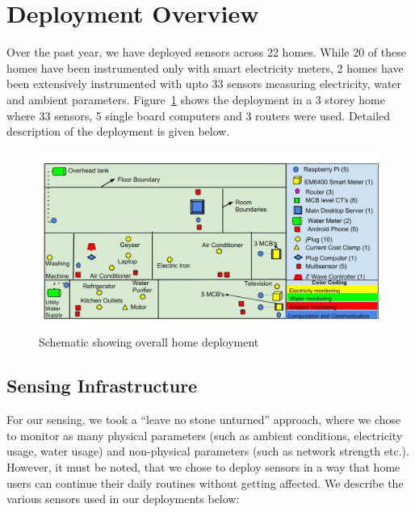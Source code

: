 \documentclass[10pt]{sensys-proc}
\newcommand{\figref}[1]{Figure~\ref{#1}}
\begin{document}
\section{Deployment Overview}
Over the past year, we have deployed sensors across 22 homes. While 20 of these homes have been instrumented only with smart electricity meters, 2 homes have been extensively instrumented with upto 33 sensors measuring electricity, water and ambient parameters. \figref{fig:overall} shows the deployment in a 3 storey home where 33 sensors, 5 single board computers and 3 routers were used. Detailed description of the deployment is given below.
\begin{figure}     
    \includegraphics[scale=0.2]{./figures/overall_deployment.jpg}    
    \caption{Schematic showing overall home deployment}   
    \label{fig:overall}
   
\end{figure}
\subsection{Sensing Infrastructure}
\label{sec:sensing}
For our sensing, we took a ``leave no stone unturned'' approach, where  we chose to monitor as many physical parameters (such as ambient conditions, electricity usage, water usage) and non-physical parameters (such as network strength etc.). However, it must be noted, that we chose to deploy sensors in a way that home users can continue their daily routines without getting affected. We describe the various sensors used in our deployments below:
\end{document}
